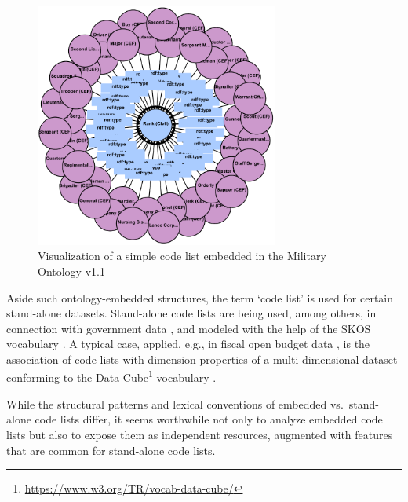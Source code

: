 \begin{figure}[ht]
\centering
\includegraphics[width=8cm]{figures/code-list-visualized}
\caption{Visualization of a simple code list embedded in the Military Ontology v1.1 \cite{military_ontology}}
\label{fig:code-list-visualized}
\end{figure}

Aside such ontology-embedded structures, 
the term `code list' is used for certain stand-alone datasets. %
Stand-alone code lists are being used, among others, in connection with government data %
\cite{guide_code_list}, and modeled with the help of
the SKOS vocabulary \cite{miles2009skos}. 
A typical case, applied, e.g., in fiscal open budget data \cite{DBLP:conf/smap/FilippidisKKIB16}, is the association of code lists with dimension properties of a multi-dimensional dataset conforming to the Data Cube\footnote{\url{https://www.w3.org/TR/vocab-data-cube/}} vocabulary \cite{obeu_dcv}.

While the structural patterns and lexical conventions of embedded vs.~stand-alone code lists differ, it seems worthwhile not only to analyze embedded code lists but also to expose them as independent resources, augmented with features that are common for stand-alone code lists. 

